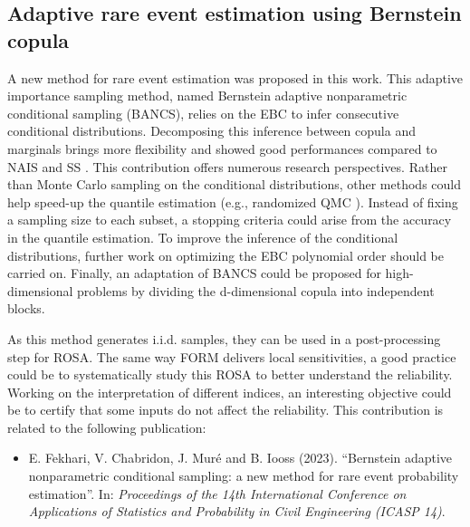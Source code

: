 \subsection*{Adaptive rare event estimation using Bernstein copula}

A new method for rare event estimation was proposed in this work. 
This adaptive importance sampling method, named Bernstein adaptive nonparametric conditional sampling (BANCS), relies on the EBC to infer consecutive conditional distributions. 
Decomposing this inference between copula and marginals brings more flexibility and showed good performances compared to NAIS \citep{zhang_1996_NIS} and SS \citep{AuBeck2001}. 
This contribution offers numerous research perspectives. 
Rather than Monte Carlo sampling on the conditional distributions, other methods could help speed-up the quantile estimation (e.g., randomized QMC \citep{tuffin_2019}). 
Instead of fixing a sampling size to each subset, a stopping criteria could arise from the accuracy in the quantile estimation. 
To improve the inference of the conditional distributions, further work on optimizing the EBC polynomial order should be carried on. 
Finally, an adaptation of BANCS could be proposed for high-dimensional problems by dividing the d-dimensional copula into independent blocks.   

As this method generates i.i.d. samples, they can be used in a post-processing step for ROSA.
The same way FORM delivers local sensitivities, a good practice could be to systematically study this ROSA to better understand the reliability. 
Working on the interpretation of different indices, an interesting objective could be to certify that some inputs do not affect the reliability. 
This contribution is related to the following publication:
\begin{itemize}
    \footnotesize
    \item[\ding{125}] E. Fekhari, V. Chabridon, J. Muré and B. Iooss (2023). ``Bernstein adaptive nonparametric conditional sampling: a new method for rare event probability estimation''. In: \textit{Proceedings of the 14th International Conference on Applications of Statistics and Probability in Civil Engineering (ICASP 14)}.
\end{itemize}





